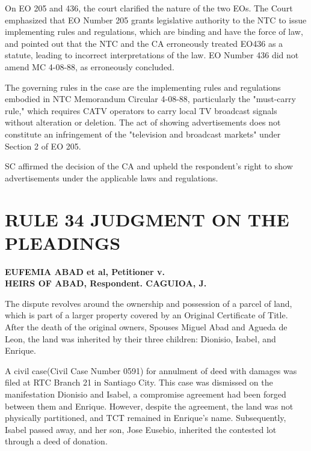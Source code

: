 \documentclass[
12pt,
oneside,
onehalfspacing,
headsepline
]{DigestCollection}
\begin{document}
On EO 205 and 436, the court clarified the nature of the two EOs. The Court emphasized that EO Number 205 grants legislative authority to the NTC to issue implementing rules and regulations, which are binding and have the force of law, and pointed out that the NTC and the CA erroneously treated EO436 as a statute, leading to incorrect interpretations of the law. EO Number 436 did not amend MC 4-08-88, as erroneously concluded.

The governing rules in the case are the implementing rules and regulations embodied in NTC Memorandum Circular 4-08-88, particularly the "must-carry rule," which requires CATV operators to carry local TV broadcast signals without alteration or deletion. The act of showing advertisements does not constitute an infringement of the "television and broadcast markets" under Section 2 of EO 205.

SC affirmed the decision of the CA and upheld the respondent's right to show advertisements under the applicable laws and regulations.

\chapter{RULE 34 JUDGMENT ON THE PLEADINGS}
\label{9a8e4cb0-0a16-11ef-932c-63c852f65e48}


\label{46f86490-0a2b-11ef-a1a5-03b0bde1fccf}


\noindent\textbf{EUFEMIA ABAD et al, Petitioner v. \\ HEIRS OF ABAD, Respondent. CAGUIOA, J.}\vspace{0.4cm}

The dispute revolves around the ownership and possession of a parcel of land, which is part of a larger property covered by an Original Certificate of Title. After the death of the original owners, Spouses Miguel Abad and Agueda de Leon, the land was inherited by their three children: Dionisio, Isabel, and Enrique. 

A civil case(Civil Case Number 0591) for annulment of deed with damages was filed at RTC Branch 21 in Santiago City. This case was dismissed on the manifestation Dionisio and Isabel, a compromise agreement had been forged between them and Enrique. However, despite the agreement, the land was not physically partitioned, and TCT remained in Enrique's name. Subsequently, Isabel passed away, and her son, Jose Eusebio, inherited the contested lot through a deed of donation. 
\end{document}
